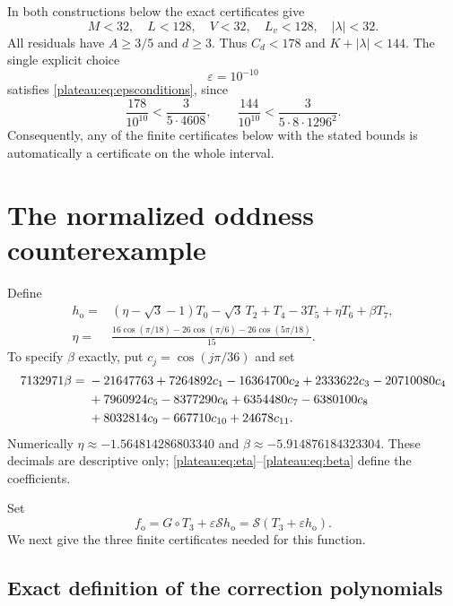 \documentclass[11pt]{article}
\theoremstyle{remark}\newtheorem{remark}[theorem]{Remark}
\newcommand{\eps}{\varepsilon}
\begin{document}
In both constructions below the exact certificates give
\begin{equation}\label{plateau:eq:universalbounds}
 M<32,\quad L<128,\quad V<32,\quad L_v<128,\quad|\lambda|<32.
\end{equation}
All residuals have $A\ge3/5$ and $d\ge3$. Thus $C_d<178$ and
$K+|\lambda|<144$. The single explicit choice
\begin{equation}\label{plateau:eq:epsilon}
 \eps=10^{-10}
\end{equation}
satisfies \eqref{plateau:eq:epsconditions}, since
\[
 \frac{178}{10^{10}}<\frac{3}{5\cdot4608},\qquad
 \frac{144}{10^{10}}<\frac{3}{5\cdot8\cdot1296^2}.
\]
Consequently, any of the finite certificates below with the stated bounds
is automatically a certificate on the whole interval.

\section{The normalized oddness counterexample}

Define
\begin{align}
 h_{\mathrm{o}}={}&(\eta-\sqrt3-1)T_0-\sqrt3\,T_2+T_4-3T_5
                  +\eta T_6+\beta T_7,\label{plateau:eq:oddh}\\
 \eta={}&\frac{16\cos(\pi/18)-26\cos(\pi/6)-26\cos(5\pi/18)}{15}.
 \label{plateau:eq:eta}
\end{align}
To specify $\beta$ exactly, put $c_j=\cos(j\pi/36)$ and set
\begin{align}
 7132971\beta={}&-21647763+7264892c_1-16364700c_2+2333622c_3
 -20710080c_4\notag\\
 &+7960924c_5-8377290c_6+6354480c_7-6380100c_8\notag\\
 &+8032814c_9-667710c_{10}+24678c_{11}.
 \label{plateau:eq:beta}
\end{align}
Numerically $\eta\approx-1.564814286803340$ and
$\beta\approx-5.914876184323304$. These decimals are descriptive only;
\eqref{plateau:eq:eta}--\eqref{plateau:eq:beta} define the coefficients.

Set
\begin{equation}\label{plateau:eq:fo}
 f_{\mathrm{o}}=G\circ T_3+\eps\mathcal S h_{\mathrm{o}}
 =\mathcal S(T_3+\eps h_{\mathrm{o}}).
\end{equation}
We next give the three finite certificates needed for this function.

\subsection{Exact definition of the correction polynomials}
\end{document}
